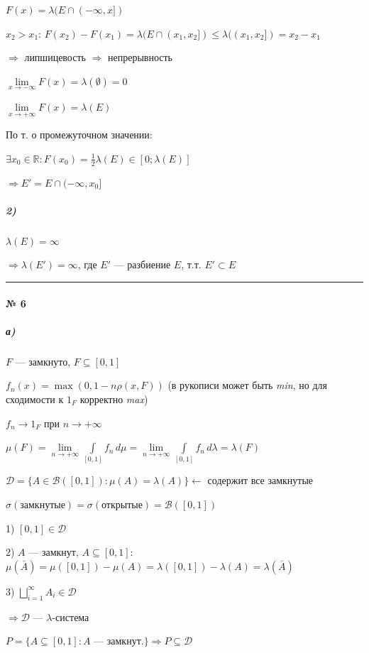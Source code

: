 \documentclass[11pt, a4paper]{article}
\begin{document}
$F(x) = \lambda(E \cap (-\infty, x])$

$x_2 > x_1$: $F(x_2) - F(x_1) = \lambda(E \cap (x_1, x_2]) \leqslant \lambda((x_1, x_2]) = x_2 - x_1$

$\Rightarrow$ липшицевость $\Rightarrow$ непрерывность

$\lim\limits_{x \to -\infty} F(x) = \lambda(\emptyset) = 0$

$\lim\limits_{x \to +\infty} F(x) = \lambda(E)$

По т. о промежуточном значении:

$\exists x_0 \in \mathbb{R}: F(x_0) = \frac{1}{2}\lambda(E) \in [0; \lambda(E)]$

$\Rightarrow E' = E \cap (-\infty, x_0]$

\subparagraph{2)}
$\lambda(E) = \infty$

$\Rightarrow \lambda(E') = \infty$, где $E'$ --- разбиение $E$, т.т. $E' \subset E$

\vspace{1.5em}
\hrule
\vspace{1.5em}

\paragraph{№ 6}

\subparagraph{а)}
$F$ --- замкнуто, $F \subseteq [0, 1]$

$f_n(x) = \max(0, 1 - n \rho(x, F))$ \quad (в рукописи может быть \textit{min}, но для сходимости к $1_F$ корректно \textit{max})

$f_n \to 1_F$ при $n \to +\infty$

$\mu(F) = \lim\limits_{n \to +\infty} \int\limits_{[0,1]} f_n\,d\mu = \lim\limits_{n \to +\infty} \int\limits_{[0,1]} f_n\,d\lambda = \lambda(F)$

$\mathcal{D} = \{A \in \mathcal{B}([0,1]) : \mu(A) = \lambda(A)\} \leftarrow$ содержит все замкнутые

$\sigma(\text{замкнутые}) = \sigma(\text{открытые}) = \mathcal{B}([0,1])$

1) $[0,1] \in \mathcal{D}$

2) $A$ --- замкнут, $A \subseteq [0,1]$: $\mu(\bar{A}) = \mu([0,1]) - \mu(A) = \lambda([0,1]) - \lambda(A) = \lambda(\bar{A})$

3) $\bigsqcup\limits_{i=1}^\infty A_i \in \mathcal{D}$

$\Rightarrow \mathcal{D}$ --- $\lambda$-система

$P = \{A \subseteq [0,1] : A \text{ --- замкнут.}\} \Rightarrow P \subseteq \mathcal{D}$
\end{document}
